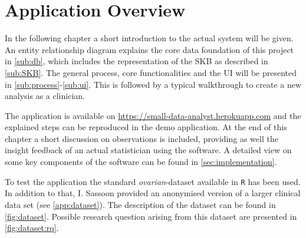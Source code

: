 \section{Application Overview}
\label{sec:app}
In the following chapter a short introduction to the actual system will be given. An entity relationship diagram explains the core data foundation of this project in \autoref{sub:db}, which includes the representation of the \gls{SKB} as described in \autoref{sub:SKB}. The general process, core functionalities and the \gls{UI} will be presented in \autoref{sub:process}-\ref{sub:ui}. This is followed by a typical walkthrough to create a new analysis as a clinician. 

The application is available on \href{https://small-data-analyst.herokuapp.com}{https://small-data-analyst.herokuapp.com} and the explained steps can be reproduced in the demo application. At the end of this chapter a short discussion on observations is included, providing as well the insight feedback of an actual statistician using the software. A detailed view on some key components of the software can be found in \autoref{sec:implementation}.


To test the application the standard \textit{ovarian}-dataset available in \texttt{R} has been used. In addition to that, I. Sassoon provided an anonymised version of a larger clinical data set (see \autoref{app:dataset}). The description of the dataset can be found in \autoref{fig:dataset}. Possible research question arising from this dataset are presented in \autoref{fig:dataset:rq}.













